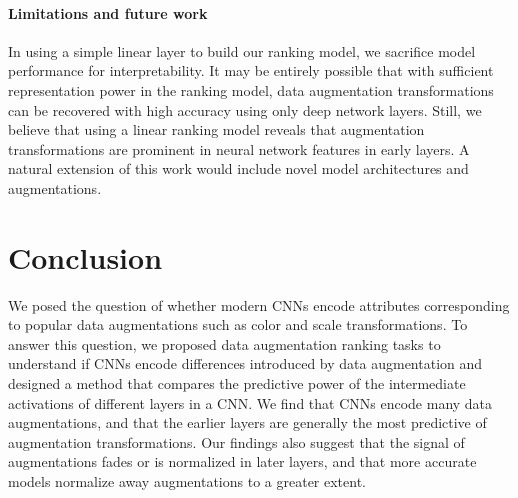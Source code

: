 


\paragraph{Limitations and future work}
In using a simple linear layer to build our ranking model, we sacrifice model performance for interpretability.
It may be entirely possible that with sufficient representation power in the ranking model, data augmentation transformations can be recovered with high accuracy using only deep network layers.
Still, we believe that using a linear ranking model reveals that augmentation transformations are prominent in neural network features in early layers.
A natural extension of this work would include novel model architectures and augmentations.
\section{Conclusion}
We posed the question of whether modern CNNs encode attributes corresponding to popular data augmentations  such as color and scale transformations.
To answer this question, we proposed data augmentation ranking tasks to understand if CNNs encode differences introduced by data augmentation and designed a method that compares the predictive power of the intermediate activations of different layers in a CNN.
We find that CNNs encode many data augmentations, and that the earlier layers are generally the most predictive of augmentation transformations.
Our findings also suggest that the signal of augmentations fades or is normalized in later layers, and that more accurate models normalize away augmentations to a greater extent.
\clearpage
